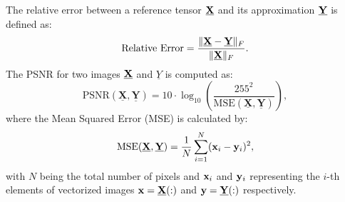 \documentclass[preprint,12pt]{elsarticle}
\theoremstyle{definition}
\begin{document}
The relative error between a reference tensor $\underline{\bf X}$ and its approximation $\underline{\bf Y}$ is defined as:
\begin{equation}
    \text{Relative Error} = \frac{\|\underline{\bf X} - \underline{\bf Y}\|_F}{\|\underline{\bf X}\|_F}.
\end{equation}
The PSNR for two images $\underline{\bf X}$ and $\underline{Y}$ is computed as:
\begin{equation}
    \text{PSNR}(\underline{\mathbf{X}},\underline{\mathbf{Y}}) = 10 \cdot \log_{10} \left( \frac{255^2}{\text{MSE}(\underline{\mathbf{X}},\underline{\mathbf{Y}})} \right),
\end{equation}
where the Mean Squared Error (MSE) is calculated by:
\begin{equation}
    \text{MSE}(\underline{\mathbf{X}},\underline{\mathbf{Y}}) = \frac{1}{N} \sum_{i=1}^N ({\bf x}_i - {\bf y}_i)^2,
\end{equation}
with $N$ being the total number of pixels and ${\bf x}_i$ and ${\bf y}_i$ representing the $i$-th elements of vectorized images ${\bf x}=\underline{\mathbf{X}}(:)$ and ${\bf y}=\underline{\mathbf{Y}}(:)$ respectively.
    
\end{document}
